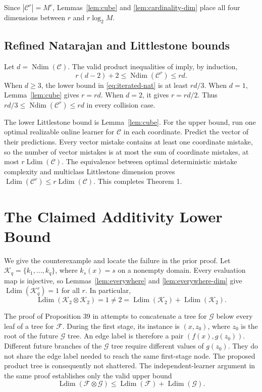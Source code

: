 \documentclass[twoside]{article}
\newcommand{\C}{\mathcal C}
\newcommand{\Ldim}{\operatorname{Ldim}}
\newcommand{\Ndim}{\operatorname{Ndim}}
\begin{document}
Since $|\C^r|=M^r$, Lemmas~\ref{lem:cube} and \ref{lem:cardinality-dim} place all four dimensions between $r$ and $r\log_2M$.

\subsection{Refined Natarajan and Littlestone bounds}

Let $d=\Ndim(\C)$. The valid product inequalities of \citet{hanneke2024list} imply, by induction,
\begin{equation}
 r(d-2)+2\leq\Ndim(\C^r)\leq rd.
 \label{eq:iterated-nat}
\end{equation}
When $d\geq3$, the lower bound in \eqref{eq:iterated-nat} is at least $rd/3$. When $d=1$, Lemma~\ref{lem:cube} gives $r=rd$. When $d=2$, it gives $r=rd/2$. Thus $rd/3\leq\Ndim(\C^r)\leq rd$ in every collision case.

The lower Littlestone bound is Lemma~\ref{lem:cube}. For the upper bound, run one optimal realizable online learner for $\C$ in each coordinate. Predict the vector of their predictions. Every vector mistake contains at least one coordinate mistake, so the number of vector mistakes is at most the sum of coordinate mistakes, at most $r\Ldim(\C)$. The equivalence between optimal deterministic mistake complexity and multiclass Littlestone dimension proves $\Ldim(\C^r)\leq r\Ldim(\C)$. This completes Theorem 1.

\section{The Claimed Additivity Lower Bound}
\label{app:additivity}

We give the counterexample and locate the failure in the prior proof. Let $\mathcal K_q=\{k_1,\ldots,k_q\}$, where $k_s(x)=s$ on a nonempty domain. Every evaluation map is injective, so Lemmas~\ref{lem:everywhere} and \ref{lem:everywhere-dim} give $\Ldim(\mathcal K_q^r)=1$ for all $r$. In particular,
\[
 \Ldim(\mathcal K_2\otimes\mathcal K_2)=1
 \neq2=\Ldim(\mathcal K_2)+\Ldim(\mathcal K_2).
\]

The proof of Proposition 39 in \citet{hanneke2024list} attempts to concatenate a tree for $\mathcal G$ below every leaf of a tree for $\mathcal F$. During the first stage, its instance is $(x,z_0)$, where $z_0$ is the root of the future $\mathcal G$ tree. An edge label is therefore a pair $(f(x),g(z_0))$. Different future branches of the $\mathcal G$ tree require different values of $g(z_0)$. They do not share the edge label needed to reach the same first-stage node. The proposed product tree is consequently not shattered. The independent-learner argument in the same proof establishes only the valid upper bound
\[
 \Ldim(\mathcal F\otimes\mathcal G)
 \leq\Ldim(\mathcal F)+\Ldim(\mathcal G).
\]
\end{document}
